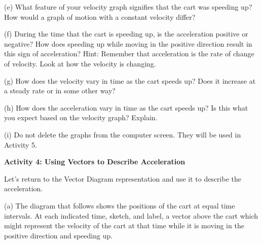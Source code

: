 (e) What feature of your velocity graph signifies that the cart was speeding
up? How would a graph of motion with a constant velocity differ? 
\vspace{13mm}

(f) During the time that the cart is speeding up, is the acceleration positive
or negative? How does speeding up while moving in the positive direction result
in this sign of acceleration? Hint: Remember that acceleration is the rate of
change of velocity. Look at how the velocity is changing. 
\vspace{13mm}

(g) How does the velocity vary in time as the cart speeds up? Does it increase
at a steady rate or in some other way? 
\vspace{13mm}

(h) How does the acceleration vary in time as the cart speeds up? Is this what
you expect based on the velocity graph? Explain.
\vspace{13mm}

(i) Do not delete the graphs from the computer screen.  They will be used in Activity 5.
\vspace{10mm}

\textbf{Activity 4: Using Vectors to Describe Acceleration} 

Let's return to the Vector Diagram representation and use it to describe the
acceleration.

(a) The diagram that follows shows the positions of the cart at equal time intervals.
At each indicated time, sketch, and label, a vector above the cart which might represent
the velocity of the cart at that time while it is moving in the positive direction and speeding up.

